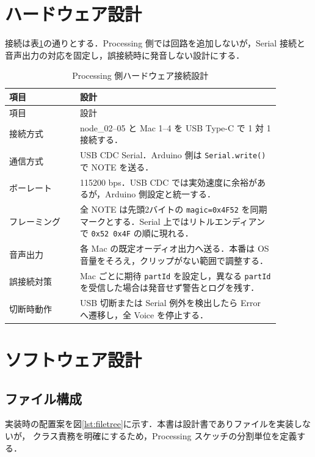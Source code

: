 \documentclass[lualatex,book,openany,paper=a4paper,jafontsize=11.5pt,jafontscale=1.05]{jlreq}
\begin{document}
\section{ハードウェア設計}
接続は表\ref{tab:hw-design}の通りとする．Processing 側では回路を追加しないが，Serial 接続と
音声出力の対応を固定し，誤接続時に発音しない設計にする．

\begin{longtable}{p{0.23\linewidth}p{0.65\linewidth}}
\caption{Processing 側ハードウェア接続設計}\label{tab:hw-design}\\
\hline
項目 & 設計 \\
\hline
\endfirsthead
\hline
項目 & 設計 \\
\hline
\endhead
接続方式 & node\_02--05 と Mac 1--4 を USB Type-C で 1 対 1 接続する． \\
\hline
通信方式 & USB CDC Serial．Arduino 側は \texttt{Serial.write()} で NOTE を送る． \\
\hline
ボーレート & 115200 bps．USB CDC では実効速度に余裕があるが，Arduino 側設定と統一する． \\
\hline
フレーミング & 全 NOTE は先頭2バイトの \texttt{magic=0x4F52} を同期マークとする．Serial 上ではリトルエンディアンで \texttt{0x52 0x4F} の順に現れる． \\
\hline
音声出力 & 各 Mac の既定オーディオ出力へ送る．本番は OS 音量をそろえ，クリップがない範囲で調整する． \\
\hline
誤接続対策 & Mac ごとに期待 \texttt{partId} を設定し，異なる \texttt{partId} を受信した場合は発音せず警告とログを残す． \\
\hline
切断時動作 & USB 切断または Serial 例外を検出したら Error へ遷移し，全 Voice を停止する． \\
\hline
\end{longtable}

\section{ソフトウェア設計}

\subsection{ファイル構成}
実装時の配置案を図\ref{lst:filetree}に示す．本書は設計書でありファイルを実装しないが，
クラス責務を明確にするため，Processing スケッチの分割単位を定義する．
\end{document}
